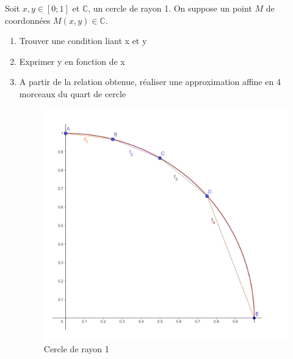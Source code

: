 \documentclass[a4paper]{article}
\begin{document}
Soit $x,y \in [0;1]$ et $\mathbb{C}$, un cercle  de rayon 1. On suppose un point $M$ de coordonnées $M(x,y) \in \mathbb{C}$. 
\begin{enumerate}
    \item Trouver une condition liant x et y
    \item Exprimer y en fonction de x
    \item A partir de la relation obtenue, réaliser une approximation affine en 4 morceaux du quart de cercle

\begin{figure}[!h]
    \centering
    \includegraphics[width=0.5\linewidth]{cercle.jpg}
    \caption{Cercle de rayon 1}
    \label{fig:enter-label}
\end{figure}



    \end{enumerate}
\end{document}
